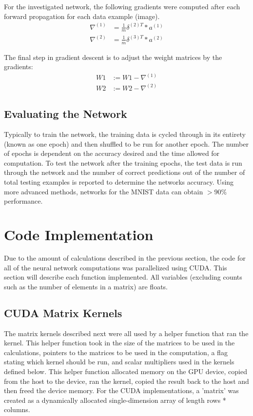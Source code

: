 \documentclass[11pt]{article}
\begin{document}
For the investigated network, the following gradients were computed after each forward propagation for each data example (image).
\begin{align*}
	\nabla^{(1)} & = \frac{1}{m} \delta^{(2)T}*a^{(1)} \\
	\nabla^{(2)} & = \frac{1}{m} \delta^{(3)T}*a^{(2)} 
\end{align*} 

The final step in gradient descent is to adjust the weight matrices by the gradients:
\begin{align*}
	W1 & := W1 - \nabla^{(1)} \\
	W2 & := W2 - \nabla^{(2)} 
\end{align*}

\subsection{Evaluating the Network}
Typically to train the network, the training data is cycled through in its entirety (known as one epoch) and then shuffled to be run for another epoch. The number of epochs is dependent on the accuracy desired and the time allowed for computation. To test the network after the training epochs, the test data is run through the network and the number of correct predictions out of the number of total testing examples is reported to determine the networks accuracy. Using more advanced methods, networks for the MNIST data can obtain $>90\%$ performance.

\section{Code Implementation}
Due to the amount of calculations described in the previous section, the code for all of the neural network computations was parallelized using CUDA. This section will describe each function implemented. All variables (excluding counts such as the number of elements in a matrix) are floats.

\subsection{CUDA Matrix Kernels}
The matrix kernels described next were all used by a helper function that ran the kernel. This helper function took in the size of the matrices to be used in the calculations, pointers to the matrices to be used in the computation, a flag stating which kernel should be run, and scalar multipliers used in the kernels defined below. This helper function allocated memory on the GPU device, copied from the host to the device, ran the kernel, copied the result back to the host and then freed the device memory. For the CUDA implementations, a 'matrix' was created as a dynamically allocated single-dimension array of length rows * columns.
\end{document}
